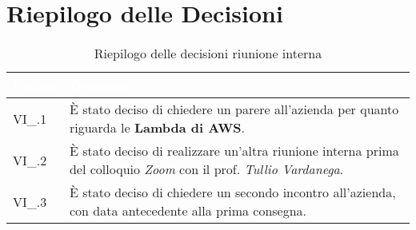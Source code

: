 \section{Riepilogo delle Decisioni}


\begin{table}[!htbp]
\renewcommand{\arraystretch}{1.5}
\begin{tabular}{m{}<{\centering}  m{}<{\centering}}
\rowcolor{darkblue} \textcolor{white}{\textbf{Codice}} & \textcolor{white}{\textbf{Decisione}} \\
\hline
VI\_\D{}.1 & È stato deciso di chiedere un parere all'azienda per quanto riguarda le \textbf{Lambda di AWS}.\\
\rowcolor{gray!10} VI\_\D{}.2 &  È stato deciso di realizzare un'altra riunione interna prima del colloquio \textit{Zoom} con il prof. \textit{Tullio Vardanega}.\\
VI\_\D{}.3 & È stato deciso di chiedere un secondo incontro all'azienda, con data antecedente alla prima consegna.\\
\end{tabular}
\caption{Riepilogo delle decisioni riunione interna \D{}}
\end{table}
